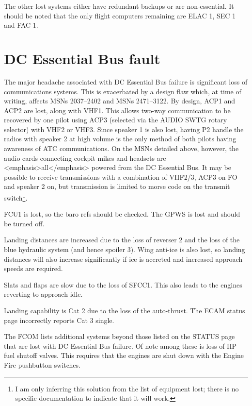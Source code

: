 \documentclass[a5paper,11pt,twoside]{book}
\newcommand{\multicite}[1]{
  \nopagebreak
  \noindent{\footnotesize\color{blue}{[ #1 ]}}
}
\begin{document}
The other lost systems either have redundant backups or are non-essential. It
should be noted that the only flight computers remaining are ELAC 1, SEC 1 and
FAC 1.

\multicite{\uline{ELEC}~DC~BUS~2~FAULT, FCOM~PRO.AEP.ELEC}


\section{DC Essential Bus fault}

The major headache associated with DC Essential Bus failure is significant loss
of communications systems. This is exacerbated by a design flaw which, at time
of writing, affects MSNs 2037–2402 and MSNs 2471–3122. By design, ACP1 and ACP2
are lost, along with VHF1. This allows two-way communication to be recovered by
one pilot using ACP3 (selected via the AUDIO SWTG rotary selector) with VHF2 or
VHF3. Since speaker 1 is also lost, having P2 handle the radios with speaker 2
at high volume is the only method of both pilots having awareness of ATC
communications. On the MSNs detailed above, however, the audio cards connecting
cockpit mikes and headsets are <emphasis>all</emphasis> powered from the DC
Essential Bus. It may be possible to receive transmissions with a combination of
VHF2/3, ACP3 on FO and speaker 2 on, but transmission is limited to morse code
on the transmit switch\footnote{I am only inferring this solution from the list
of equipment lost; there is no specific documentation to indicate that it will
work.}.

FCU1 is lost, so the baro refs should be checked. The GPWS is lost and should be
turned off.

Landing distances are increased due to the loss of reverser 2 and the loss of
the blue hydraulic system (and hence spoiler 3). Wing anti-ice is also lost, so
landing distances will also increase significantly if ice is accreted and
increased approach speeds are required.

Slats and flaps are slow due to the loss of SFCC1. This also leads to the
engines reverting to approach idle.

Landing capability is Cat 2 due to the loss of the auto-thrust. The ECAM status
page incorrectly reports Cat 3 single.

The FCOM lists additional systems beyond those listed on the STATUS page that
are lost with DC Essential Bus failure. Of note among these is loss of HP fuel
shutoff valves. This requires that the engines are shut down with the Engine
Fire pushbutton switches.
\end{document}
